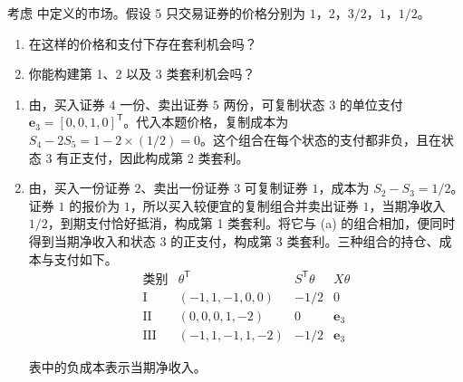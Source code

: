 \begin{problem}
 考虑 中定义的市场。假设 5 只交易证券的价格分别为 $1$，$2$，$3/2$，$1$，$1/2$。
\begin{enumerate}[label=(\alph*)]
    \item 在这样的价格和支付下存在套利机会吗？
    \item 你能构建第 1、2 以及 3 类套利机会吗？
\end{enumerate}
\end{problem}
\begin{solution}[blank-type=manual,blank-vsep=9\baselineskip]
\begin{enumerate}[label=(\alph*)]
    \item 由，买入证券 $4$ 一份、卖出证券 $5$ 两份，可复制状态 $3$ 的单位支付 $\mathbf e_3=[0,0,1,0]^{\mathsf T}$。代入本题价格，复制成本为 $S_4-2S_5=1-2\times(1/2)=0$。这个组合在每个状态的支付都非负，且在状态 $3$ 有正支付，因此构成第 2 类套利。

    \item 由，买入一份证券 $2$、卖出一份证券 $3$ 可复制证券 $1$，成本为 $S_2-S_3=1/2$。证券 $1$ 的报价为 $1$，所以买入较便宜的复制组合并卖出证券 $1$，当期净收入 $1/2$，到期支付恰好抵消，构成第 1 类套利。将它与 (a) 的组合相加，便同时得到当期净收入和状态 $3$ 的正支付，构成第 3 类套利。三种组合的持仓、成本与支付如下。
    \[
      \begin{array}{c|c|c|c}
       \text{类别}&\theta^{\mathsf T}&S^{\mathsf T}\theta&X\theta\\\hline
       \mathrm I&(-1,1,-1,0,0)&-1/2&0\\
       \mathrm {II}&(0,0,0,1,-2)&0&\mathbf e_3\\
       \mathrm {III}&(-1,1,-1,1,-2)&-1/2&\mathbf e_3
      \end{array}
    \]

    表中的负成本表示当期净收入。\qedhere
\end{enumerate}
\end{solution}

